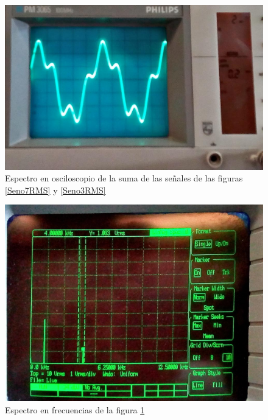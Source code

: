 \documentclass{article}
\begin{document}
\begin{figure}[h!]
    \centering
    \includegraphics[scale=0.25]{Imagenes/FrecSin.jpg}
    \caption{Espectro en osciloscopio de la suma de las señales de las figuras \ref{Seno7RMS} y \ref{Seno3RMS} }
    \label{fig:SenalCOmb}
\end{figure}

\begin{figure}[h!]
    \centering
    \includegraphics[scale=0.15]{Imagenes/Frec1.jpg}
    \caption{Espectro en frecuencias de la figura \ref{fig:SenalCOmb}}
    \label{fig:my_label}
\end{figure}
\end{document}
